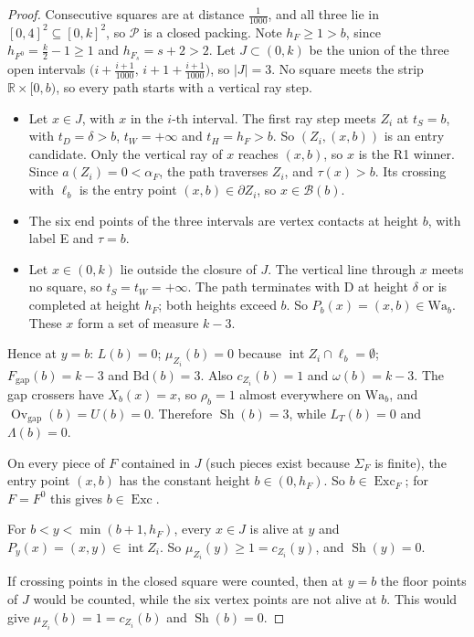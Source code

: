\documentclass[11pt]{amsart}
\newcommand{\R}{\mathbb R}
\newcommand{\cP}{\mathcal P}
\newcommand{\Sh}{\operatorname{Sh}}
\newcommand{\Ovgap}{\operatorname{Ov}_{\mathrm{gap}}}
\newcommand{\Fgap}{F_{\mathrm{gap}}}
\newcommand{\Exc}{\operatorname{Exc}}
\newcommand{\Lam}{\Lambda}
\newcommand{\Fz}{F^{0}}
\newcommand{\Fs}{F_{s}}
\theoremstyle{definition}
\theoremstyle{remark}
\numberwithin{equation}{section}
\begin{document}
\begin{proof}
Consecutive squares are at distance $\frac1{1000}$, and all three lie in $[0,4]^2\subseteq[0,k]^2$, so $\cP$ is a closed packing. Note $h_F\ge1>b$, since $h_{\Fz}=\frac k2-1\ge1$ and $h_{\Fs}=s+2>2$. Let $J\subset(0,k)$ be the union of the three open intervals $\big(i+\frac{i+1}{1000},\,i+1+\frac{i+1}{1000}\big)$, so $|J|=3$. No square meets the strip $\R\times[0,b)$, so every path starts with a vertical ray step.
\begin{itemize}
\item Let $x\in J$, with $x$ in the $i$-th interval. The first ray step meets $Z_i$ at $t_S=b$, with $t_D=\delta>b$, $t_W=+\infty$ and $t_H=h_F>b$. So $(Z_i,(x,b))$ is an entry candidate. Only the vertical ray of $x$ reaches $(x,b)$, so $x$ is the R1 winner. Since $a(Z_i)=0<\alpha_F$, the path traverses $Z_i$, and $\tau(x)>b$. Its crossing with $\ell_b$ is the entry point $(x,b)\in\partial Z_i$, so $x\in\mathcal B(b)$.
\item The six end points of the three intervals are vertex contacts at height $b$, with label E and $\tau=b$.
\item Let $x\in(0,k)$ lie outside the closure of $J$. The vertical line through $x$ meets no square, so $t_S=t_W=+\infty$. The path terminates with D at height $\delta$ or is completed at height $h_F$; both heights exceed $b$. So $P_b(x)=(x,b)\in\mathrm{Wa}_b$. These $x$ form a set of measure $k-3$.
\end{itemize}
Hence at $y=b$: $L(b)=0$; $\mu_{Z_i}(b)=0$ because $\operatorname{int}Z_i\cap\ell_b=\emptyset$; $\Fgap(b)=k-3$ and $\mathrm{Bd}(b)=3$. Also $c_{Z_i}(b)=1$ and $\omega(b)=k-3$. The gap crossers have $X_b(x)=x$, so $\rho_b=1$ almost everywhere on $\mathrm{Wa}_b$, and $\Ovgap(b)=U(b)=0$. Therefore $\Sh(b)=3$, while $L_T(b)=0$ and $\Lam(b)=0$.

On every piece of $F$ contained in $J$ (such pieces exist because $\Sigma_F$ is finite), the entry point $(x,b)$ has the constant height $b\in(0,h_F)$. So $b\in\Exc_F$; for $F=\Fz$ this gives $b\in\Exc$.

For $b<y<\min(b+1,h_F)$, every $x\in J$ is alive at $y$ and $P_y(x)=(x,y)\in\operatorname{int}Z_i$. So $\mu_{Z_i}(y)\ge1=c_{Z_i}(y)$, and $\Sh(y)=0$.

If crossing points in the closed square were counted, then at $y=b$ the floor points of $J$ would be counted, while the six vertex points are not alive at $b$. This would give $\mu_{Z_i}(b)=1=c_{Z_i}(b)$ and $\Sh(b)=0$.
\end{proof}
\end{document}
